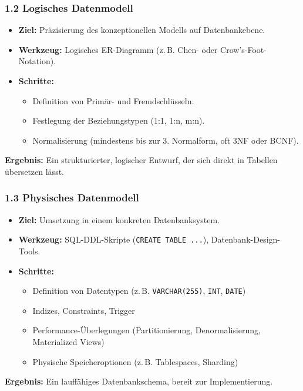 \subsubsection*{1.2 Logisches Datenmodell}
\begin{itemize}
	\item \textbf{Ziel:} Präzisierung des konzeptionellen Modells auf Datenbankebene.
	\item \textbf{Werkzeug:} Logisches ER-Diagramm (z.\,B. Chen- oder Crow’s-Foot-Notation).
	\item \textbf{Schritte:}
	\begin{itemize}
		\item Definition von Primär- und Fremdschlüsseln.
		\item Festlegung der Beziehungstypen (1:1, 1:n, m:n).
		\item Normalisierung (mindestens bis zur 3. Normalform, oft 3NF oder BCNF).
	\end{itemize}
\end{itemize}
\textbf{Ergebnis:} Ein strukturierter, logischer Entwurf, der sich direkt in Tabellen übersetzen lässt.

\subsubsection*{1.3 Physisches Datenmodell}
\begin{itemize}
	\item \textbf{Ziel:} Umsetzung in einem konkreten Datenbanksystem.
	\item \textbf{Werkzeug:} SQL-DDL-Skripte (\texttt{CREATE TABLE ...}), Datenbank-Design-Tools.
	\item \textbf{Schritte:}
	\begin{itemize}
		\item Definition von Datentypen (z.\,B. \texttt{VARCHAR(255)}, \texttt{INT}, \texttt{DATE})
		\item Indizes, Constraints, Trigger
		\item Performance-Überlegungen (Partitionierung, Denormalisierung, Materialized Views)
		\item Physische Speicheroptionen (z.\,B. Tablespaces, Sharding)
	\end{itemize}
\end{itemize}
\textbf{Ergebnis:} Ein lauffähiges Datenbankschema, bereit zur Implementierung.

